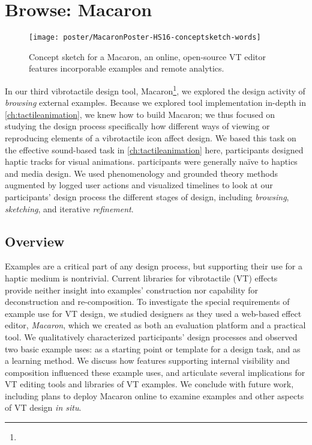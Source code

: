 


\chapter{Browse: Macaron}
\label{ch:macaron}

\begin{figure}[htbp]
\begin{center}
\texttt{[image: poster/MacaronPoster-HS16-conceptsketch-words]}
\caption{Concept sketch for a Macaron, an online, open-source VT editor features incorporable examples and remote analytics.}
\label{hapticexamples:designgallerysketch}
\end{center}
\end{figure}

\noindent
{} 
In our third vibrotactile design tool, Macaron\footnote{}, we explored the design activity of \emph{browsing} external examples.
Because we explored \haxd tool implementation in-depth in \autoref{ch:tactileanimation}, we knew how to build Macaron; we thus focused on studying the design process specifically  how different ways of viewing or reproducing elements of a vibrotactile icon affect design.
We based this task on the effective sound-based task in \autoref{ch:tactileanimation}\osE{:} here, participants designed haptic tracks for visual animations.
 participants were generally na\"ive to haptics and media design.
We used phenomenology and grounded theory methods augmented by logged user actions and visualized timelines to look at our participants' design process
the different stages of design, including \emph{browsing}, \emph{sketching}, and iterative \emph{refinement}.


\section{Overview}
Examples are a critical part of any design process,
but supporting their use for a haptic medium is nontrivial.
Current  libraries for vibrotactile (VT) effects provide neither insight into examples' construction nor  capability for 
deconstruction and re-composition.
To investigate the special requirements of example use for VT design, we studied designers as they used a web-based effect editor, \emph{Macaron}, which we created as both an evaluation platform and a practical tool. 
We qualitatively characterized participants' design processes and observed two basic example uses: as a starting point or template for a design task, and as a learning method.
We discuss how features supporting internal visibility and composition influenced these example uses, and articulate several implications for VT editing tools and libraries of VT examples.
We conclude with future work, including plans to deploy Macaron online to examine examples and other aspects of VT design \emph{in situ}.




